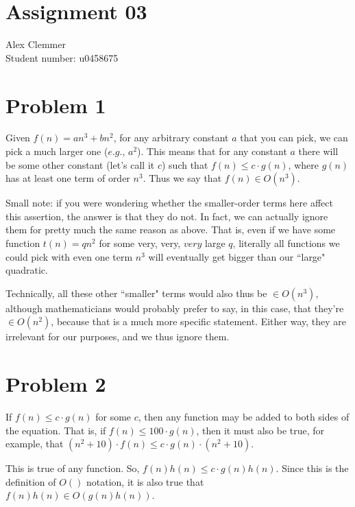 \documentclass[a4paper]{article}
\begin{document}
\section*{Assignment 03}
Alex Clemmer\\
Student number: u0458675

\section*{Problem 1}

Given $f(n) = an^3 + bn^2$, for any arbitrary constant $a$ that you can pick, we can pick a much larger one ($\textit{e.g.}$, $a^2$). This means that for any constant $a$ there will be some other constant (let's call it $c$) such that $f(n) \le c \cdot g(n)$, where $g(n)$ has at least one term of order $n^3$. Thus we say that $f(n) \in O(n^3)$.

Small note: if you were wondering whether the smaller-order terms here affect this assertion, the answer is that they do not. In fact, we can actually ignore them for pretty much the same reason as above. That is, even if we have some function $t(n) = qn^2$ for some very, very, $\textit{very}$ large $q$, literally all functions we could pick with even one term $n^3$ will eventually get bigger than our ``large" quadratic.

Technically, all these other ``smaller" terms would also thus be $\in O(n^3)$, although mathematicians would probably prefer to say, in this case, that they're $\in O(n^2)$, because that is a much more specific statement. Either way, they are irrelevant for our purposes, and we thus ignore them.

\section*{Problem 2}

If $f(n) \le c \cdot g(n)$ for some $c$, then any function may be added to both sides of the equation. That is, if $f(n) \le 100 \cdot g(n)$, then it must also be true, for example, that $(n^2 + 10) \cdot f(n) \le c \cdot g(n) \cdot (n^2 + 10)$.

This is true of any function. So, $f(n)h(n) \le c \cdot g(n)h(n)$. Since this is the definition of $O()$ notation, it is also true that $f(n)h(n) \in O(g(n)h(n))$.
\end{document}
